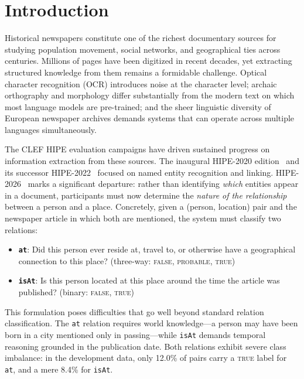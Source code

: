 \documentclass[11pt,a4paper]{article}
\begin{document}
\section{Introduction}
\label{sec:intro}

Historical newspapers constitute one of the richest documentary sources for studying population movement, social networks, and geographical ties across centuries. Millions of pages have been digitized in recent decades, yet extracting structured knowledge from them remains a formidable challenge. Optical character recognition (OCR) introduces noise at the character level; archaic orthography and morphology differ substantially from the modern text on which most language models are pre-trained; and the sheer linguistic diversity of European newspaper archives demands systems that can operate across multiple languages simultaneously.

The CLEF HIPE evaluation campaigns have driven sustained progress on information extraction from these sources. The inaugural HIPE-2020 edition~\cite{ehrmann2020} and its successor HIPE-2022~\cite{ehrmann2022} focused on named entity recognition and linking. HIPE-2026~\cite{opitz2026} marks a significant departure: rather than identifying \emph{which} entities appear in a document, participants must now determine the \emph{nature of the relationship} between a person and a place. Concretely, given a (person, location) pair and the newspaper article in which both are mentioned, the system must classify two relations:
\begin{itemize}
    \item \textbf{\texttt{at}}: Did this person ever reside at, travel to, or otherwise have a geographical connection to this place? (three-way: \textsc{false}, \textsc{probable}, \textsc{true})
    \item \textbf{\texttt{isAt}}: Is this person located at this place around the time the article was published? (binary: \textsc{false}, \textsc{true})
\end{itemize}

This formulation poses difficulties that go well beyond standard relation classification. The \texttt{at} relation requires world knowledge---a person may have been born in a city mentioned only in passing---while \texttt{isAt} demands temporal reasoning grounded in the publication date. Both relations exhibit severe class imbalance: in the development data, only 12.0\% of pairs carry a \textsc{true} label for \texttt{at}, and a mere 8.4\% for \texttt{isAt}.
\end{document}
